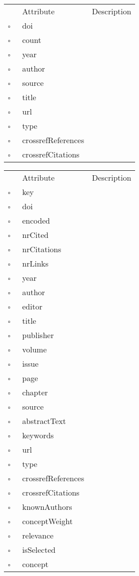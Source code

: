 \begin{table}
\caption{MissingCross  }

\begin{longtable}{llp{8cm}}
& Attribute & Description \\
$\square$\ & doi &  \\
$\square$\ & count &  \\
$\square$\ & year &  \\
$\square$\ & author &  \\
$\square$\ & source &  \\
$\square$\ & title &  \\
$\square$\ & url &  \\
$\square$\ & type &  \\
$\square$\ & crossrefReferences &  \\
$\square$\ & crossrefCitations &  \\
\end{longtable}
\label{attr:MissingCross}
\end{table}

\begin{table}
\caption{MissingWork  }

\begin{longtable}{llp{8cm}}
& Attribute & Description \\
$\square$\ & key &  \\
$\square$\ & doi &  \\
$\square$\ & encoded &  \\
$\square$\ & nrCited &  \\
$\square$\ & nrCitations &  \\
$\square$\ & nrLinks &  \\
$\square$\ & year &  \\
$\square$\ & author &  \\
$\square$\ & editor &  \\
$\square$\ & title &  \\
$\square$\ & publisher &  \\
$\square$\ & volume &  \\
$\square$\ & issue &  \\
$\square$\ & page &  \\
$\square$\ & chapter &  \\
$\square$\ & source &  \\
$\square$\ & abstractText &  \\
$\square$\ & keywords &  \\
$\square$\ & url &  \\
$\square$\ & type &  \\
$\square$\ & crossrefReferences &  \\
$\square$\ & crossrefCitations &  \\
$\square$\ & knownAuthors &  \\
$\square$\ & conceptWeight &  \\
$\square$\ & relevance &  \\
$\square$\ & isSelected &  \\
$\square$\ & concept &  \\
\end{longtable}
\label{attr:MissingWork}
\end{table}

